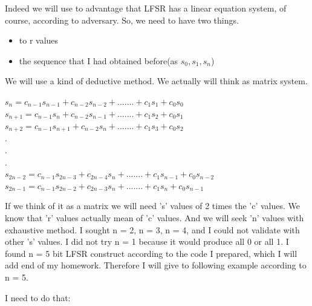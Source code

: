 \documentclass[a4paper, 11pt]{article}
\begin{document}
\singlespacing Indeed we will use to advantage that LFSR has a linear equation system, of course, according to adversary.
So, we need to have two things. 
\begin{itemize}
    \item to r values
    \item the sequence that I had obtained before(as $s_{0}, s_{1}, s_{n}$)
\end{itemize}
We will  use a kind of deductive method. We actually will think as matrix system.  %

 \begin{center} 
     $s_{n} = c_{n-1}s_{n-1} + c_{n-2}s_{n-2} +.......+ c_{1}s_{1} + c_{0}s_{0}$
     $s_{n+1} = c_{n-1}s_{n} + c_{n-2}s_{n-1} +.......+ c_{1}s_{2} + c_{0}s_{1}$
     $s_{n+2} = c_{n-1}s_{n+1} + c_{n-2}s_{n} +.......+ c_{1}s_{3} + c_{0}s_{2}$\\
     .\\
      .\\
      .\\
      $s_{2n-2} = c_{n-1}s_{2n-3} + c_{2n-4}s_{n} +.......+ c_{1}s_{n-1} + c_{0}s_{n-2}$\\
      $s_{2n-1} = c_{n-1}s_{2n-2} + c_{2n-3}s_{n} +.......+ c_{1}s_{n} + c_{0}s_{n-1}$\\

      
 \end{center} 
 

 If we think of it as a matrix we will need 's' values of 2 times the 'c' values. 
 We know that 'r' values actually mean of 'c' values. And we 
 will seek  'n' values with exhaustive method. I sought n = 2, n = 3, n = 4, and I could not validate with other 's' values. I did not try n = 1 because  it would produce all 0 or all 1.
I found n = 5 bit LFSR construct according to the code I prepared, which I will add end of my homework. Therefore I will give to following example according to n = 5.

I need to do that:
\end{document}
